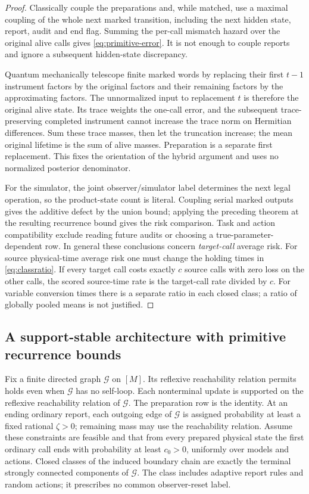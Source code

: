 \begin{proof}
Classically couple the preparations and, while matched, use a maximal coupling of the whole next marked transition, including the next hidden state, report, audit and end flag. Summing the per-call mismatch hazard over the original alive calls gives \eqref{eq:primitive-error}. It is not enough to couple reports and ignore a subsequent hidden-state discrepancy.

Quantum mechanically telescope finite marked words by replacing their first $t-1$ instrument factors by the original factors and their remaining factors by the approximating factors. The unnormalized input to replacement $t$ is therefore the original alive state. Its trace weights the one-call error, and the subsequent trace-preserving completed instrument cannot increase the trace norm on Hermitian differences. Sum these trace masses, then let the truncation increase; the mean original lifetime is the sum of alive masses. Preparation is a separate first replacement. This fixes the orientation of the hybrid argument and uses no normalized posterior denominator.

For the simulator, the joint observer/simulator label determines the next legal operation, so the product-state count is literal. Coupling serial marked outputs gives the additive defect by the union bound; applying the preceding theorem at the resulting recurrence bound gives the risk comparison. Task and action compatibility exclude reading future audits or choosing a true-parameter-dependent row. In general these conclusions concern \emph{target-call} average risk. For source physical-time average risk one must change the holding times in \eqref{eq:classratio}. If every target call costs exactly $c$ source calls with zero loss on the other calls, the scored source-time rate is the target-call rate divided by $c$. For variable conversion times there is a separate ratio in each closed class; a ratio of globally pooled means is not justified.
\end{proof}

\subsection{A support-stable architecture with primitive recurrence bounds}
Fix a finite directed graph $\mathcal G$ on $[M]$. Its reflexive reachability relation permits holds even when $\mathcal G$ has no self-loop. Each nonterminal update is supported on the reflexive reachability relation of $\mathcal G$. The preparation row is the identity. At an ending ordinary report, each outgoing edge of $\mathcal G$ is assigned probability at least a fixed rational $\zeta>0$; remaining mass may use the reachability relation. Assume these constraints are feasible and that from every prepared physical state the first ordinary call ends with probability at least $c_0>0$, uniformly over models and actions. Closed classes of the induced boundary chain are exactly the terminal strongly connected components of $\mathcal G$. The class includes adaptive report rules and random actions; it prescribes no common observer-reset label.

